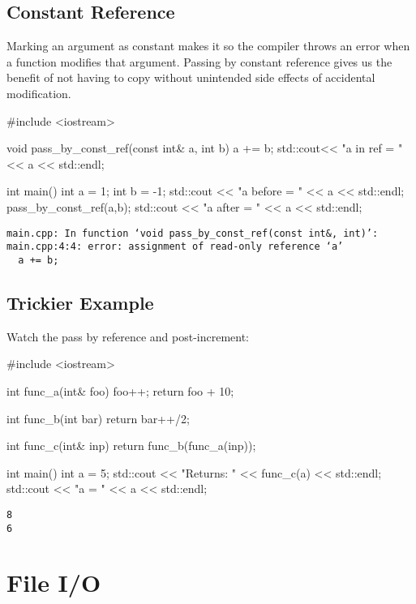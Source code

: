 \documentclass[12pt,letterpaper,twoside]{article}
\begin{document}
\subsection{Constant Reference}
Marking an argument as constant makes it so the compiler throws an error when a function modifies that argument.  Passing by constant reference gives us the benefit of not having to copy without unintended side effects of accidental modification.
\begin{cpp}
#include <iostream>

void pass_by_const_ref(const int& a, int b){
	a += b;
	std::cout<< "a in ref = " << a << std::endl;
}

int main() {
  int a = 1;
  int b = -1;
  std::cout << "a before = " << a << std::endl;
  pass_by_const_ref(a,b);
  std::cout << "a after  = " << a << std::endl;
}
\end{cpp}
\vspace{-3ex}
{\footnotesize
\begin{verbatim}
main.cpp: In function ‘void pass_by_const_ref(const int&, int)’:
main.cpp:4:4: error: assignment of read-only reference ‘a’
  a += b;
\end{verbatim}
}

\subsection{Trickier Example}
Watch the pass by reference and post-increment:
\begin{cpp}
#include <iostream>

int func_a(int& foo){
  foo++;
  return foo + 10;
}

int func_b(int bar){
  return bar++/2;
}

int func_c(int& inp){
  return func_b(func_a(inp));
}

int main() {
  int a = 5;
  std::cout << "Returns: " << func_c(a) << std::endl;
  std::cout << "a = " << a << std::endl;
}
\end{cpp}
\vspace{-3ex}
{
\footnotesize
\begin{verbatim}
8
6
\end{verbatim}
}

\newpage

\section{File I/O}
\end{document}
